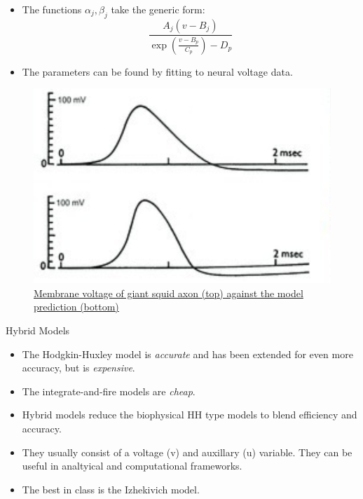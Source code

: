 \documentclass[
  ignorenonframetext,
]{beamer}
\begin{document}
\begin{frame}{}
\protect\hypertarget{section}{}
\begin{itemize}
\item
  The functions \(\alpha_j, \beta_j\) take the generic form:
  \[\frac{A_j (v - B_j)}{\exp\left(\frac{v-B_p}{C_p}\right) - D_p}\]
\item
  The parameters can be found by fitting to neural voltage data.
\end{itemize}

\begin{figure}

{\centering \includegraphics[width=\textwidth,height=0.4\textheight]{./images/hhneuronetrace.png}

}

\caption{\href{https://www.ncbi.nlm.nih.gov/pmc/articles/PMC3424716/}{Membrane
voltage of giant squid axon (top) against the model prediction
(bottom)}}

\end{figure}
\end{frame}

\begin{frame}{Hybrid Models}
\protect\hypertarget{hybrid-models}{}
\begin{itemize}
\item
  The Hodgkin-Huxley model is \emph{accurate} and has been extended for
  even more accuracy, but is \emph{expensive}.
\item
  The integrate-and-fire models are \emph{cheap}.
\item
  Hybrid models reduce the biophysical HH type models to blend
  efficiency and accuracy.
\item
  They usually consist of a voltage (v) and auxillary (u) variable. They
  can be useful in analtyical and computational frameworks.
\item
  The best in class is the Izhekivich model.
\end{itemize}
\end{frame}
\end{document}
